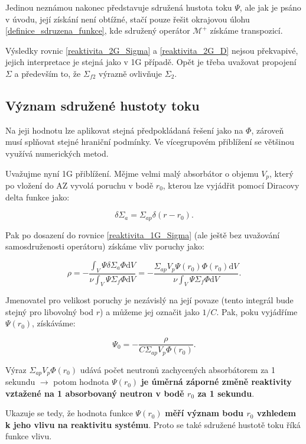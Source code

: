 Jedinou neznámou nakonec představuje sdružená hustota toku $\Psi$, ale jak je psáno v úvodu, její získání není obtížné, stačí pouze řešit okrajovou úlohu \eqref{definice_sdruzena_funkce}, kde sdružený operátor $\mathcal{M^+}$ získáme transpozicí.

Výsledky rovnic \eqref{reaktivita_2G_Sigma} a \eqref{reaktivita_2G_D} nejsou překvapivé, jejich interpretace je stejná jako v 1G případě. Opět je třeba uvažovat propojení $\Sigma$ a především to, že $\Sigma_{f2}$ výrazně ovlivňuje $\Sigma_2$.

\subsection{Význam sdružené hustoty toku}

Na jeji hodnotu lze aplikovat stejná předpokládaná řešení jako na $\Phi$, zároveň musí splňovat stejné hraniční podmínky. Ve vícegrupovém přiblížení se většinou využívá numerických metod.

Uvažujme nyní 1G přiblížení. Mějme velmi malý absorbátor o objemu $V_p$, který po vložení do AZ vyvolá poruchu v bodě $r_0$, kterou lze vyjádřit pomocí Diracovy delta funkce jako:

$$ \delta \Sigma_a = \Sigma_{ap} \delta (r - r_0). $$

Pak po dosazení do rovnice \eqref{reaktivita_1G_Sigma} (ale ještě bez uvažování samosdruženosti operátoru) získáme vliv poruchy jako:

$$ \rho = - \dfrac{\int_V \Psi \delta \Sigma_a \Phi \text{d}V}{\nu \int_V \Psi \Sigma_f \Phi \text{d}V} = - \dfrac{\Sigma_{ap} V_p \Psi(r_0) \Phi(r_0) \text{d}V}{\nu \int_V \Psi \Sigma_f \Phi \text{d}V}. $$

Jmenovatel pro velikost poruchy je nezávislý na její povaze (tento integrál bude stejný pro libovolný bod $r$) a můžeme jej označit jako $1/C$. Pak, poku vyjádříme $\Psi(r_0)$, získáváme:

$$ \Psi_0 = - \dfrac{\rho}{C \Sigma_{ap} V_p \Phi(r_0)}. $$

Výraz $\Sigma_{ap} V_p \Phi(r_0)$ udává počet neutronů zachycených absorbátorem za 1 sekundu $\rightarrow$ potom hodnota $\Psi(r_0)$ \textbf{je úměrná záporné změně reaktivity vztažené na 1 absorbovaný neutron v bodě $r_0$ za 1 sekundu}.

Ukazuje se tedy, že hodnota funkce $\Psi(r_0)$ \textbf{měří význam bodu $r_0$ vzhledem k jeho vlivu na reaktivitu systému}. Proto se také sdružené hustotě toku říká funkce vlivu.

